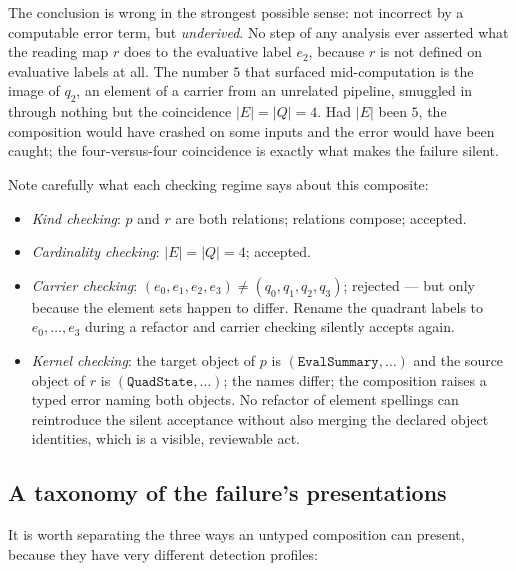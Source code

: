 The conclusion is wrong in the strongest possible sense: not incorrect by a
computable error term, but \emph{underived}. No step of any analysis ever
asserted what the reading map $r$ does to the evaluative label $e_2$, because
$r$ is not defined on evaluative labels at all. The number $5$ that surfaced
mid-computation is the image of $q_2$, an element of a carrier from an
unrelated pipeline, smuggled in through nothing but the coincidence
$|E| = |Q| = 4$. Had $|E|$ been $5$, the composition would have crashed on
some inputs and the error would have been caught; the four-versus-four
coincidence is exactly what makes the failure silent.

Note carefully what each checking regime says about this composite:

\begin{itemize}
\item \emph{Kind checking}: $p$ and $r$ are both relations; relations compose;
accepted.
\item \emph{Cardinality checking}: $|E| = |Q| = 4$; accepted.
\item \emph{Carrier checking}: $(e_0, e_1, e_2, e_3) \neq (q_0, q_1, q_2,
q_3)$; rejected --- but only because the element sets happen to differ. Rename
the quadrant labels to $e_0, \dots, e_3$ during a refactor and carrier
checking silently accepts again.
\item \emph{Kernel checking}: the target object of $p$ is
$(\texttt{EvalSummary}, \dots)$ and the source object of $r$ is
$(\texttt{QuadState}, \dots)$; the names differ; the composition raises a
typed error naming both objects. No refactor of element spellings can
reintroduce the silent acceptance without also merging the declared object
identities, which is a visible, reviewable act.
\end{itemize}

\subsection{A taxonomy of the failure's presentations}

It is worth separating the three ways an untyped composition can present,
because they have very different detection profiles:

